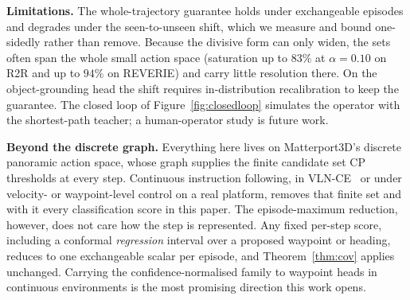 \textbf{Limitations.}
The whole-trajectory guarantee holds under exchangeable episodes and degrades
under the seen-to-unseen shift, which we measure and bound one-sidedly rather
than remove. Because the divisive form can only widen, the sets often span
the whole small action space (saturation up to $83\%$ at $\alpha = 0.10$ on
R2R and up to $94\%$ on REVERIE) and carry little resolution there. On the
object-grounding head the shift requires in-distribution recalibration to
keep the guarantee. The closed loop of Figure~\ref{fig:closedloop} simulates
the operator with the shortest-path teacher; a human-operator study is
future work.

\textbf{Beyond the discrete graph.}
Everything here lives on Matterport3D's discrete panoramic action space,
whose graph supplies the finite candidate set CP thresholds at every
step. Continuous instruction following, in
VLN-CE~\cite{krantz2020vlnce} or under velocity- or waypoint-level control
on a real platform, removes that finite set and with it every
classification score in this paper. The episode-maximum reduction, however,
does not care how the step is represented. Any fixed per-step score, including a conformal
\emph{regression} interval over a proposed waypoint or heading, reduces to
one exchangeable scalar per episode, and Theorem~\ref{thm:cov} applies
unchanged. Carrying the confidence-normalised family to waypoint heads in
continuous environments is the most promising direction this work opens.
